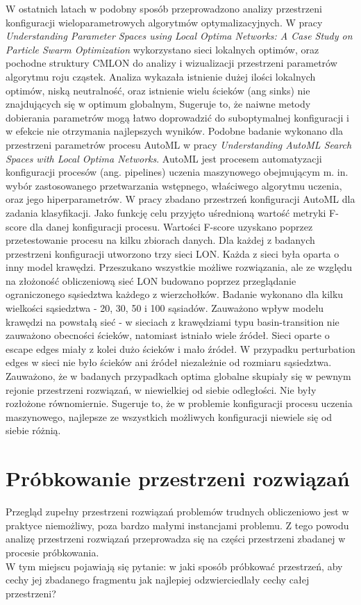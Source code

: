 W ostatnich latach w podobny sposób przeprowadzono analizy przestrzeni konfiguracji wieloparametrowych algorytmów optymalizacyjnych.
W pracy \textit{Understanding Parameter Spaces using Local Optima Networks: A Case Study on Particle Swarm Optimization}\cite{DBLP:conf/gecco/CleghornO21}
wykorzystano sieci lokalnych optimów, oraz pochodne struktury CMLON do analizy i wizualizacji przestrzeni parametrów algorytmu roju cząstek.
Analiza wykazała istnienie dużej ilości lokalnych optimów, niską neutralność, oraz istnienie wielu ścieków (ang sinks) nie znajdujących się w optimum globalnym,
Sugeruje to, że naiwne metody dobierania parametrów mogą łatwo doprowadzić do suboptymalnej konfiguracji i w efekcie nie otrzymania najlepszych wyników.
Podobne badanie wykonano dla przestrzeni parametrów procesu AutoML w pracy \textit{Understanding AutoML Search Spaces with Local Optima Networks}\cite{DBLP:conf/gecco/TeixeiraP22}.
AutoML jest procesem automatyzacji konfiguracji procesów (ang. pipelines) uczenia maszynowego obejmującym m. in. wybór zastosowanego przetwarzania wstępnego,
właściwego algorytmu uczenia, oraz jego hiperparametrów. W pracy zbadano przestrzeń konfiguracji AutoML dla zadania klasyfikacji.
Jako funkcję celu przyjęto uśrednioną wartość metryki F-score dla danej konfiguracji procesu.
Wartości F-score uzyskano poprzez przetestowanie procesu na kilku zbiorach danych.
Dla każdej z badanych przestrzeni konfiguracji utworzono trzy sieci LON. Każda z sieci była oparta o inny model krawędzi.
Przeszukano wszystkie możliwe rozwiązania, ale ze względu na złożoność obliczeniową sieć LON budowano poprzez przeglądanie
ograniczonego sąsiedztwa każdego z wierzchołków. Badanie wykonano dla kilku wielkości sąsiedztwa - 20, 30, 50 i 100 sąsiadów.
Zauważono wpływ modelu krawędzi na powstałą sieć - w sieciach z krawędziami typu basin-transition nie zauważono obecności ścieków,
natomiast istniało wiele źródeł. Sieci oparte o escape edges miały z kolei dużo ścieków i mało źródeł.
W przypadku perturbation edges w sieci nie było ścieków ani źródeł niezależnie od rozmiaru sąsiedztwa.
Zauważono, że w badanych przypadkach optima globalne skupiały się w pewnym rejonie przestrzeni rozwiązań, w niewielkiej od siebie odległości.
Nie były rozłożone równomiernie. Sugeruje to, że w problemie konfiguracji procesu uczenia maszynowego, najlepsze ze wszystkich możliwych
konfiguracji niewiele się od siebie różnią.


\section{Próbkowanie przestrzeni rozwiązań}
Przegląd zupełny przestrzeni rozwiązań problemów trudnych obliczeniowo jest w praktyce niemożliwy, poza bardzo małymi instancjami problemu.
Z tego powodu analizę przestrzeni rozwiązań przeprowadza się na części przestrzeni zbadanej w procesie próbkowania. \\
W tym miejscu pojawiają się pytanie: w jaki sposób próbkować przestrzeń, aby cechy jej zbadanego fragmentu
jak najlepiej odzwierciedlały cechy całej przestrzeni?

